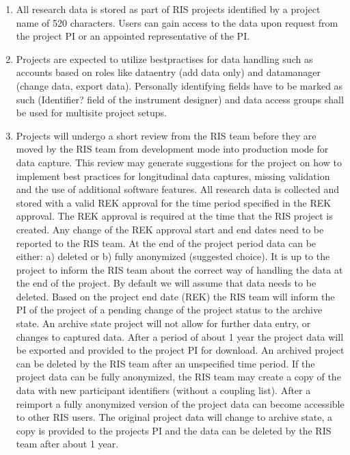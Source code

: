 \documentclass[letterpaper,10pt,english]{sphinxmanual}
\begin{document}
\begin{enumerate}
%
\setcounter{enumi}{2}
\item {} 
\sphinxAtStartPar
All research data is stored as part of RIS projects identified by a project name of 5\sphinxhyphen{}20 characters. Users can gain access to the data upon request from the project PI or an appointed representative of the PI.

\item {} 
\sphinxAtStartPar
Projects are expected to utilize best\sphinxhyphen{}practises for data handling such as accounts based on roles like data\sphinxhyphen{}entry (add data only) and data\sphinxhyphen{}manager (change data, export data). Personally identifying fields have to be marked as such (Identifier? field of the instrument designer) and data access groups shall be used for multi\sphinxhyphen{}site project setups.

\item {} 
\sphinxAtStartPar
Projects will undergo a short review from the RIS team before they are moved by the RIS team from development mode into production mode for data capture. This review may generate suggestions for the project on how to implement best practices for longitudinal data captures, missing validation and the use of additional software features. All research data is collected and stored with a valid REK approval for the time period specified in the REK approval. The REK approval is required at the time that the RIS project is created. Any change of the REK approval start and end dates need to be reported to the RIS team. At the end of the project period data can be either: a) deleted or  b) fully anonymized (suggested choice). It is up to the project to inform the RIS team about the correct way of handling the data at the end of the project. By default we will assume that data needs to be deleted. Based on the project end date (REK) the RIS team will inform the PI of the project of a pending change of the project status to the archive state. An archive state project will not allow for further data entry, or changes to captured data. After a period of about 1 year the project data will be exported and provided to the project PI for download. An archived project can be deleted by the RIS team after an unspecified time period. If the project data can be fully anonymized, the RIS team may create a copy of the data with new participant identifiers (without a coupling list). After a re\sphinxhyphen{}import a fully anonymized version of the project data can become accessible to other RIS users. The original project data will change to archive state, a copy is provided to the projects PI and the data can be deleted by the RIS team after about 1 year.

\end{enumerate}
\end{document}
